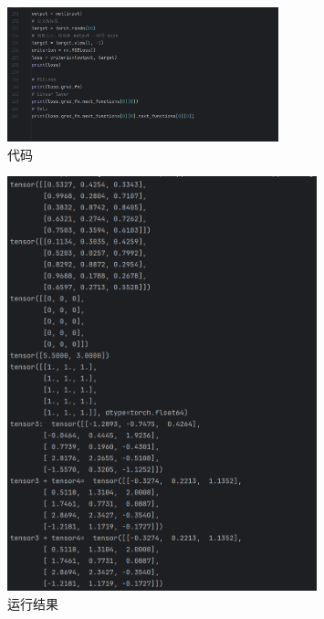 \documentclass{article}
\begin{document}
\begin{figure}[htbp]
\centering
\includegraphics[width=0.7\textwidth]{5.png}
\caption{代码}
\end{figure}

\begin{figure}[htbp]
\centering
\includegraphics[width=0.8\textwidth]{6.png}
\caption{运行结果}
\end{figure}
\end{document}
